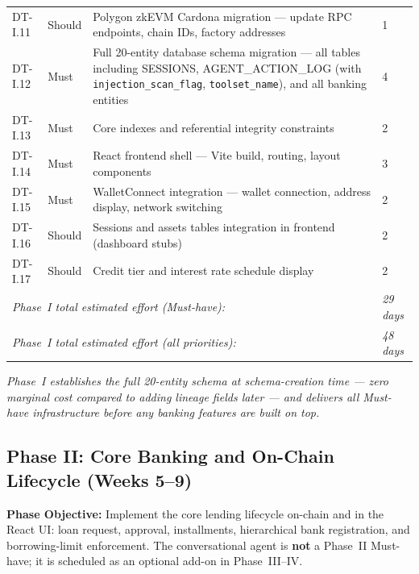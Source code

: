 \documentclass[12pt,a4paper]{report}
\begin{document}
\begin{table}[H]
\begin{tabular}{p{1.8cm}p{1.8cm}p{7.5cm}p{1.5cm}}
DT-I.11 & Should & Polygon zkEVM Cardona migration --- update RPC endpoints, chain IDs, factory addresses & 1 \\
DT-I.12 & Must & Full 20-entity database schema migration --- all tables including SESSIONS, AGENT\_ACTION\_LOG (with \texttt{injection\_scan\_flag}, \texttt{toolset\_name}), and all banking entities & 4 \\
DT-I.13 & Must & Core indexes and referential integrity constraints & 2 \\
DT-I.14 & Must & React frontend shell --- Vite build, routing, layout components & 3 \\
DT-I.15 & Must & WalletConnect integration --- wallet connection, address display, network switching & 2 \\
DT-I.16 & Should & Sessions and assets tables integration in frontend (dashboard stubs) & 2 \\
DT-I.17 & Should & Credit tier and interest rate schedule display & 2 \\
\multicolumn{3}{l}{\textit{Phase~I total estimated effort (Must-have):}} & \textit{29 days} \\
\multicolumn{3}{l}{\textit{Phase~I total estimated effort (all priorities):}} & \textit{48 days} \\
\bottomrule
\end{tabular}
\end{table}


\vspace{2pt}
\noindent\textit{\small Phase~I establishes the full 20-entity schema at schema-creation time --- zero marginal cost compared to adding lineage fields later --- and delivers all Must-have infrastructure before any banking features are built on top.}

\subsection{Phase II: Core Banking and On-Chain Lifecycle (Weeks 5--9)}

\textbf{Phase Objective:} Implement the core lending lifecycle on-chain and in the React UI: loan request, approval, installments, hierarchical bank registration, and borrowing-limit enforcement. The conversational agent is \textbf{not} a Phase~II Must-have; it is scheduled as an optional add-on in Phase~III--IV.
\end{document}

